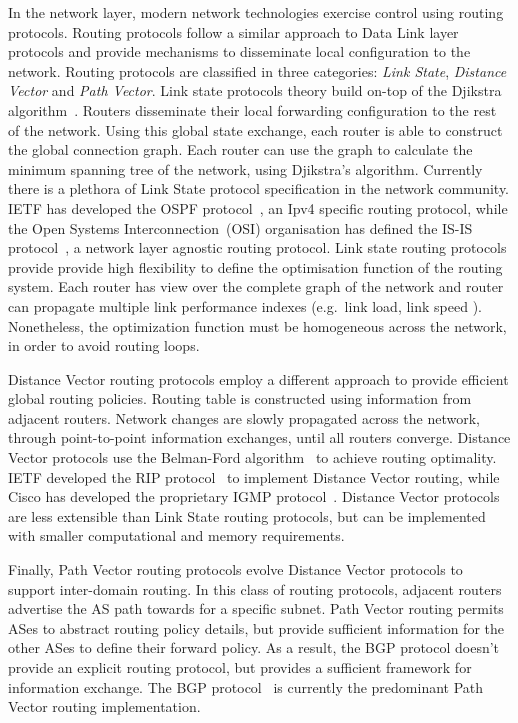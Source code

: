 In the network layer, modern network technologies exercise control using routing
protocols. Routing protocols follow a similar approach to Data Link layer
protocols and provide mechanisms to disseminate local configuration to the
network. Routing protocols are classified in three categories: \emph{Link
  State}, \emph{Distance Vector} and \emph{Path Vector}. Link state protocols
theory build on-top of the Djikstra algorithm~\cite{Djikstra1959}. Routers
disseminate their local forwarding configuration to the rest of the network.
Using this global state exchange, each router is able to construct the global
connection graph. Each router can use the graph to calculate the minimum
spanning tree of the network, using Djikstra's algorithm.  Currently there is a
plethora of Link State protocol specification in the network community.  IETF
has developed the OSPF protocol~\cite{2328}, an Ipv4 specific routing protocol,
while the Open Systems Interconnection~(OSI) organisation has defined the IS-IS
protocol~\cite{RFC1142}, a network layer agnostic routing protocol.  Link state
routing protocols provide provide high flexibility to define the optimisation
function of the routing system.  Each router has view over the complete graph of
the network and router can propagate multiple link performance indexes
(e.g.~link load, link speed ).  Nonetheless, the optimization function must be
homogeneous across the network, in order to avoid routing loops.

Distance Vector routing protocols employ a different approach to provide
efficient global routing policies. Routing table is constructed using
information from adjacent routers. Network changes are slowly propagated across
the network, through point-to-point information exchanges, until all routers
converge.  Distance Vector protocols use the Belman-Ford
algorithm~\cite{bellman1956} to achieve routing optimality. IETF developed the
RIP  protocol~\cite{RFC2453} to implement Distance Vector routing, while Cisco
has developed the proprietary IGMP protocol~\cite{Rutgers1991}. Distance Vector
protocols are less extensible than Link State routing protocols, but can be
implemented with smaller computational and memory requirements.

Finally, Path Vector routing protocols evolve Distance
Vector protocols to support inter-domain routing. In this class of routing
protocols, adjacent routers advertise the AS path towards for a specific subnet. 
Path Vector routing permits ASes to abstract routing policy details, but provide
sufficient information for the other ASes to define their forward policy. As a
result, the BGP protocol doesn't provide an explicit routing protocol, but
provides a sufficient framework for information exchange.  The BGP
protocol~\cite{RFC1265} is currently the predominant Path Vector routing
implementation.

